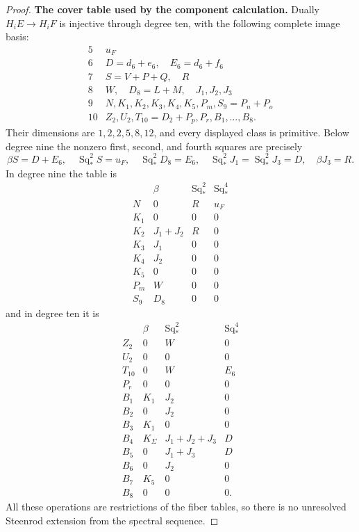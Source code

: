 \begin{proof}
\medskip\noindent
\textbf{The cover table used by the component calculation.}
Dually $H_iE\to H_iF$ is injective through degree ten, with
the following complete image basis:
\[
\begin{array}{c|l}
5&u_F\\
6&D=d_6+e_6,\quad E_6=d_6+f_6\\
7&S=V+P+Q,\quad R\\
8&W,\quad D_8=L+M,\quad J_1,J_2,J_3\\
9&N,K_1,K_2,K_3,K_4,K_5,P_m,S_9=P_n+P_o\\
10&Z_2,U_2,T_{10}=D_2+P_p,P_r,B_1,\ldots,B_8.
\end{array}
\tag{D.2.22a14}
\]
Their dimensions are $1,2,2,5,8,12$, and every displayed
class is primitive. Below degree nine the nonzero first,
second, and fourth squares are precisely
\[
 \beta S=D+E_6,\quad \operatorname{Sq}_*^2S=u_F,
 \quad \operatorname{Sq}_*^2D_8=E_6,
 \quad \operatorname{Sq}_*^2J_1=\operatorname{Sq}_*^2J_3=D,
 \quad\beta J_3=R.
\]
In degree nine the table is
\[
\begin{array}{c|ccc}
 &\beta&\operatorname{Sq}_*^2&\operatorname{Sq}_*^4\\\hline
 N&0&R&u_F\\
 K_1&0&0&0\\
 K_2&J_1+J_2&R&0\\
 K_3&J_1&0&0\\
 K_4&J_2&0&0\\
 K_5&0&0&0\\
 P_m&W&0&0\\
 S_9&D_8&0&0
\end{array}
\tag{D.2.22a15}
\]
and in degree ten it is
\[
\begin{array}{c|ccc}
 &\beta&\operatorname{Sq}_*^2&\operatorname{Sq}_*^4\\\hline
 Z_2&0&W&0\\
 U_2&0&0&0\\
 T_{10}&0&W&E_6\\
 P_r&0&0&0\\
 B_1&K_1&J_2&0\\
 B_2&0&J_2&0\\
 B_3&K_1&0&0\\
 B_4&K_\Sigma&J_1+J_2+J_3&D\\
 B_5&0&J_1+J_3&D\\
 B_6&0&J_2&0\\
 B_7&K_5&0&0\\
 B_8&0&0&0.
\end{array}
\tag{D.2.22a16}
\]
All these operations are restrictions of the fiber tables,
so there is no unresolved Steenrod extension from the spectral
sequence.


\end{proof}
